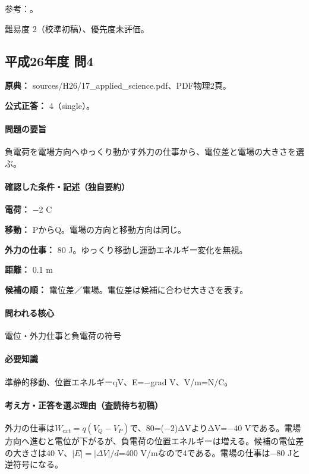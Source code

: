 \par 参考：\cite{mit_em04}。

\par 難易度 2（校準初稿）、優先度未評価。

\subsection{平成26年度 問4}
\label{q:h26-reg-applied-04}

\noindent\textbf{原典：} sources/H26/17\_applied\_science.pdf、PDF物理2頁。

\textbf{公式正答：} 4（single）。

\paragraph{問題の要旨} 負電荷を電場方向へゆっくり動かす外力の仕事から、電位差と電場の大きさを選ぶ。

\paragraph{確認した条件・記述（独自要約）}\mbox{}\par

\noindent\textbf{電荷：} −2 C\par

\noindent\textbf{移動：} PからQ。電場の方向と移動方向は同じ。\par

\noindent\textbf{外力の仕事：} 80 J。ゆっくり移動し運動エネルギー変化を無視。\par

\noindent\textbf{距離：} 0.1 m\par

\noindent\textbf{候補の順：} 電位差／電場。電位差は候補に合わせ大きさを表す。\par

\paragraph{問われる核心} 電位・外力仕事と負電荷の符号

\paragraph{必要知識} 準静的移動、位置エネルギーqV、E=−grad V、V/m=\allowbreak{}N/C。

\paragraph{考え方・正答を選ぶ理由（査読待ち初稿）} 外力の仕事は\(W_{ext}=q(V_Q-V_P)\)で、80=\allowbreak{}(−2)ΔVよりΔV=−40 Vである。電場方向へ進むと電位が下がるが、負電荷の位置エネルギーは増える。候補の電位差の大きさは40 V、\(|E|=|\Delta V|/d\)=400 V/mなので4である。電場の仕事は−80 Jと逆符号になる。

